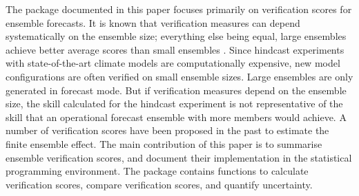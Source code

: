 \documentclass[article]{jss}\usepackage[]{graphicx}\usepackage[]{color}
\begin{document}
The  package  documented in this paper focuses primarily on verification scores for ensemble forecasts.
It is known that verification measures can depend systematically on the ensemble size; everything else being equal, large ensembles achieve better average scores than small ensembles \citep{buizza1998impact}.
Since hindcast experiments with state-of-the-art climate models are computationally expensive, 
new model configurations are often verified on small ensemble sizes.
Large ensembles are only generated in forecast mode.
But if verification measures depend on the ensemble size, the skill calculated for the hindcast experiment is not representative of the skill that an operational forecast ensemble with more members would achieve.
A number of verification scores have been proposed in the past to estimate the finite ensemble effect.
The main contribution of this paper is to summarise ensemble verification scores, and document their implementation in the  statistical programming environment.
The package  contains functions to calculate verification scores, compare verification scores, and quantify uncertainty.
\end{document}
